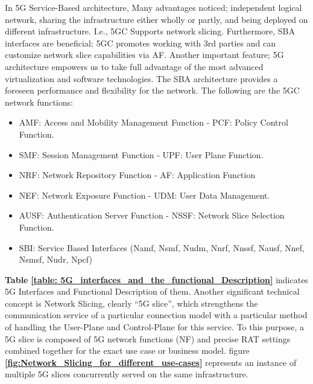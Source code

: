 In 5G Service-Based architecture, Many advantages noticed; independent logical network, sharing the infrastructure either wholly or partly, and being deployed on different infrastructure. I.e., 5GC  Supports network slicing. Furthermore, SBA interfaces are beneficial; 5GC promotes working with 3rd parties and can customize network slice capabilities via AF\cite{5G_Tech_Spec_Group_Ser2018study}.
Another important feature; 5G architecture empowers us to take full advantage of the most advanced virtualization and software technologies. The SBA architecture provides a foreseen performance and flexibility for the network. The following are the 5GC network functions\cite{5G_Sys_arch_5Gsystem2018study}:
\begin{itemize}
    \item AMF: Access and Mobility Management Function - PCF: Policy Control Function.
    \item SMF: Session Management Function - UPF: User Plane Function.
    \item NRF: Network Repository Function - AF: Application Function
    \item NEF: Network Exposure Function - UDM: User Data Management.
    \item AUSF: Authentication Server Function - NSSF: Network Slice Selection Function.
    \item SBI: Service Based Interfaces (Namf, Nsmf, Nudm, Nnrf, Nnssf, Nausf, Nnef, Nsmsf, Nudr, Npcf)
 
\end{itemize}



\textbf{Table}
\textbf{\ref{table: 5G_interfaces_and_the_functional_Description}}  indicates 5G Interfaces and Functional Description of them.
\hfill \break
Another significant technical concept is Network Slicing, clearly “5G slice”, which strengthens the communication service of a particular connection model with a particular method of handling the User-Plane and Control-Plane for this service. To this purpose, a 5G slice is composed of 5G network functions (NF) and precise RAT settings combined together for the exact use case or business model.
figure
\textbf{\ref{fig:Network_Slicing_for_different_use-cases}} represents an instance of multiple 5G slices concurrently served on the same infrastructure\cite{alliance20155g}. 
 
